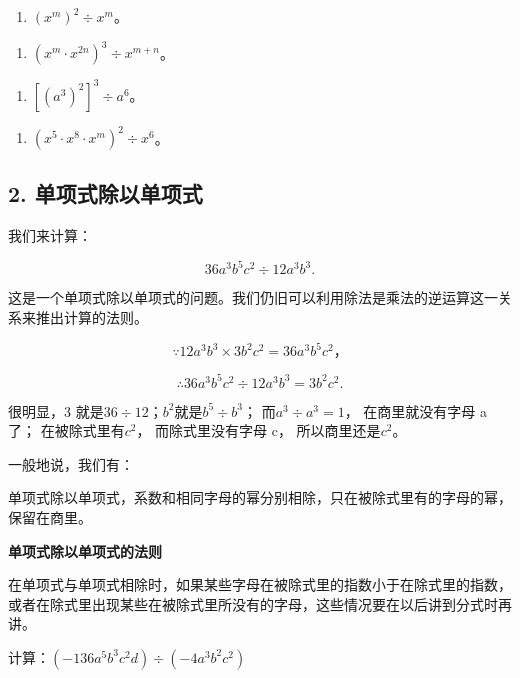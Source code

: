 \begin{enumerate}[start=14]
\item
  \((x^{m})^{2} \div x^{m}\)。
\end{enumerate}

\begin{enumerate}[start=16]
\item
  \((x^{m} \cdot x^{2n})^{3} \div x^{m+n}\)。
\end{enumerate}

\begin{enumerate}[start=18]
\item
  \(\left[(a^3)^2\right]^3 \div a^6\)。
\end{enumerate}

\begin{enumerate}[start=20]
\item
  \((x^{5} \cdot x^{8} \cdot x^{m})^{2} \div x^{6}\)。
\end{enumerate}

\subsection{2. 单项式除以单项式}

我们来计算：

\[
36 a ^{3} b ^{5} c ^{2} \div 12 a ^{3} b ^{3}.
\]

这是一个单项式除以单项式的问题。我们仍旧可以利用除法是乘法的逆运算这一关系来推出计算的法则。

\[
\because 12 a ^{3} b ^{3} \times 3 b ^{2} c ^{2} = 36 a ^{3} b ^{5} c ^{2}\text{，}
\]

\[
\therefore 36 a ^{3} b ^{5} c ^{2} \div 12 a ^{3} b ^{3} = 3 b ^{2} c ^{2}.
\]

很明显，3 就是\(36 \div 12\)；\(b^{2}\)就是\(b^{5} \div b^{3}\)；
而\(a^{3} \div a^{3} = 1\)， 在商里就没有字母 a 了；
在被除式里有\(c^{2}\)， 而除式里没有字母 c， 所以商里还是\(c^{2}\)。

一般地说，我们有：

单项式除以单项式，系数和相同字母的幂分别相除，只在被除式里有的字母的幂，保留在商里。

\textbf{单项式除以单项式的法则}

在单项式与单项式相除时，如果某些字母在被除式里的指数小于在除式里的指数，或者在除式里出现某些在被除式里所没有的字母，这些情况要在以后讲到分式时再讲。

 计算：\((-136a^{5}b^{3}c^{2}d)\div (-4a^{3}b^{2}c^{2})\)

